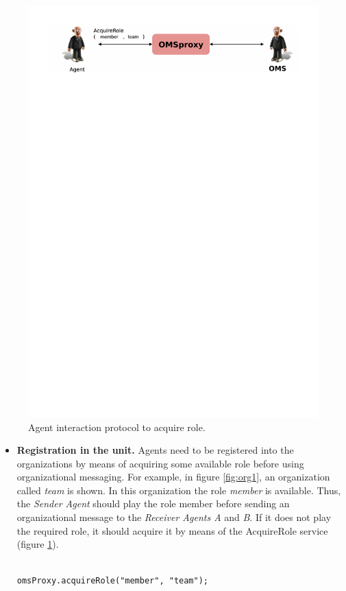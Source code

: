 \begin{figure}[h!t]
	\centering
	\includegraphics[width=.8\textwidth]{Thomas/images/acquireRoleMember}
	\caption{Agent interaction protocol to acquire role.} \label{fig:agentAcquireRole}
\end{figure}

\begin{itemize}
\item \textbf{Registration in the unit.} Agents need to be registered into the organizations by means of acquiring some available role before using organizational messaging. For example, in figure \ref{fig:org1}, an organization called \textit{team} is shown. In this organization the role \textit{member} is available. Thus, the\textit{ Sender Agent} should play the role member before sending an organizational message to the \textit{Receiver Agents A} and \textit{B}. If it does not play the required role, it should acquire it by means of the AcquireRole service (figure \ref{fig:agentAcquireRole}). 




\begin{lstlisting}

omsProxy.acquireRole("member", "team");

\end{lstlisting}

\end{itemize}
